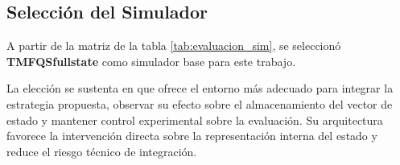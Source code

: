 \subsection{Selección del Simulador}

A partir de la matriz de la tabla \ref{tab:evaluacion_sim}, se seleccionó
\textbf{TMFQSfullstate} como simulador base para este trabajo.

La elección se sustenta en que ofrece el entorno más adecuado para integrar la
estrategia propuesta, observar su efecto sobre el almacenamiento del vector de estado y
mantener control experimental sobre la evaluación. Su arquitectura favorece la
intervención directa sobre la representación interna del estado y reduce el riesgo técnico
de integración.
